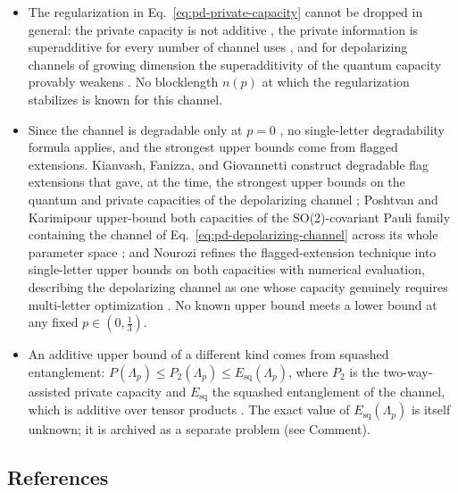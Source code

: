 \begin{itemize}
  \item The regularization in Eq.~\eqref{eq:pd-private-capacity} cannot be dropped
  in general: the private capacity is not additive
  , the private information is
  superadditive for every number of channel uses
  , and for depolarizing channels
  of growing dimension the superadditivity of the quantum capacity provably
  weakens .  No blocklength
  $n(p)$ at which the regularization stabilizes is known for this channel.

  \item Since the channel is degradable only at $p=0$
  , no single-letter
  degradability formula applies, and the strongest upper bounds come from
  flagged extensions.  Kianvash, Fanizza, and Giovannetti construct
  degradable flag extensions that gave, at the time, the strongest upper
  bounds on the quantum and private capacities of the depolarizing channel
  ; Poshtvan and
  Karimipour upper-bound both capacities of the SO(2)-covariant Pauli family
  containing the channel of Eq.~\eqref{eq:pd-depolarizing-channel} across its
  whole parameter space ; and
  Nourozi refines the flagged-extension technique into single-letter upper
  bounds on both capacities with numerical evaluation, describing the
  depolarizing channel as one whose capacity genuinely requires multi-letter
  optimization .  No known upper bound
  meets a lower bound at any fixed $p\in(0,\tfrac{1}{3})$.

  \item An additive upper bound of a different kind comes from squashed
  entanglement: $P(\Lambda_p)\le P_2(\Lambda_p)\le E_{\mathrm{sq}}(\Lambda_p)$,
  where $P_2$ is the two-way-assisted private capacity and
  $E_{\mathrm{sq}}$ the squashed entanglement of the channel, which is
  additive over tensor products
  .  The exact value of
  $E_{\mathrm{sq}}(\Lambda_p)$ is itself unknown; it is archived as a
  separate problem (see Comment).
\end{itemize}

\subsection*{References}

